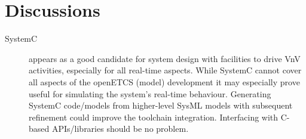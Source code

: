 \section{Discussions}


\tbd

\begin{description}
\item[SystemC]  appears as a good candidate for system design with facilities to drive VnV activities, especially for all real-time aspects. While SystemC cannot cover all aspects of the openETCS (model) development it may especially prove useful for simulating the system's real-time behaviour. Generating SystemC code/models from higher-level SysML models with subsequent refinement could improve the toolchain integration. Interfacing with C-based APIs/libraries should be no problem. 

\end{description}